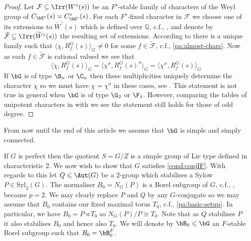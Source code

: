 \documentclass[eqthmnum, nocolour]{jt-calcs}
\newcommand{\syl}{\mathrm{Syl}}
\begin{document}
\begin{proof}
Let $\mathcal{F} \subseteq \Irr(W^{\circ}(s))$ be an $F^{\star}$-stable family of characters of the Weyl group of $C_{\bG^{\star}}(s) = C_{\bG^{\star}}^{\circ}(s)$. For each $F^{\star}$-fixed character in $\mathcal{F}$ we choose one of its extensions to $\widetilde{W}^{\circ}(s)$ which is defined over $\mathbb{Q}$, c.f., \cite[3.2]{lusztig:1984:characters-of-reductive-groups}, and denote by $\widetilde{\mathcal{F}} \subseteq \Irr(\widetilde{W}^{\circ}(s))$ the resulting set of extensions. According to \cite[4.23]{lusztig:1984:characters-of-reductive-groups} there is a unique family such that $\langle \chi, R_f^G(s)\rangle_G \neq 0$ for some $f \in \widetilde{\mathcal{F}}$, c.f., \cref{pa:almost-chars}. Now as each $f \in \widetilde{\mathcal{F}}$ is rational valued we see that
\begin{equation*}
\langle \chi, R_f^G(s) \rangle_G = \langle \chi^{\sigma}, R_f^G(s)^{\sigma} \rangle_G = \langle \chi^{\sigma}, R_f^G(s) \rangle_G
\end{equation*}
If $\bG$ is of type $\B_n$ or $\C_n$ then these multiplicities uniquely determine the character $\chi$ so we must have $\chi = \chi^{\sigma}$ in these cases, see \cite[6.3]{digne-michel:1990:lusztigs-parametrization}. This statement is not true in general when $\bG$ is of type $\G_2$ or $\F_4$. However, comparing the tables of unipotent characters in \cite[\S13.9]{carter:1993:finite-groups-of-lie-type} with \cite[6.3]{digne-michel:1990:lusztigs-parametrization} we see the statement still holds for those of odd degree.
\end{proof}

\begin{assumption}
From now until the end of this article we assume that $\bG$ is simple and simply connected.
\end{assumption}

\begin{pa}\label{pa:assump-sylow}
If $G$ is perfect then the quotient $S = G/Z$ is a simple group of Lie type defined in characteristic $2$. We now wish to show that $G$ satisfies \cref{cond:conjIF}. With regards to this let $Q \leqslant \Aut(G)$ be a $2$-group which stabilises a Sylow $P \in \syl_2(G)$. The normaliser $B_0 = N_G(P)$ is a Borel subgroup of $G$, c.f., \cite[2.29(i)]{cabanes-enguehard:2004:representation-theory-of-finite-reductive-groups}, because $p=2$. We may clearly replace $P$ and $Q$ by any $G$-conjugate so we may assume that $B_0$ contains our fixed maximal torus $T_0$, c.f., \cref{pa:basic-setup}. In particular, we have $B_0 = P \rtimes T_0$ so $N_G(P)/P \cong T_0$. Note that as $Q$ stabilises $P$ it also stabilises $B_0$ and hence also $T_0$. We will denote by $\bB_0 \leqslant \bG$ an $F$-stable Borel subgroup such that $B_0 = \bB_0^F$.
\end{pa}
\end{document}
